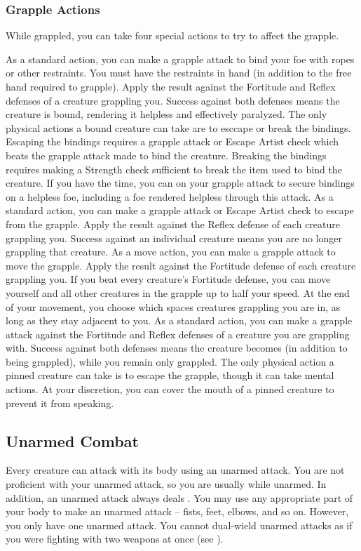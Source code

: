         \subsubsection{Grapple Actions}\label{Grapple Actions}
            While grappled, you can take four special actions to try to affect the grapple.

             As a standard action, you can make a grapple attack to bind your foe with ropes or other restraints. You must have the restraints in hand (in addition to the free hand required to grapple). Apply the result against the Fortitude and Reflex defenses of a creature grappling you. Success against both defenses means the creature is bound, rendering it helpless and effectively paralyzed. The only physical actions a bound creature can take are to esccape or break the bindings. Escaping the bindings requires a grapple attack or Escape Artist check which beats the grapple attack made to bind the creature. Breaking the bindings requires making a Strength check sufficient to break the item used to bind the creature. If you have the time, you can  on your grapple attack to secure bindings on a helpless foe, including a foe rendered helpless through this attack.
             As a standard action, you can make a grapple attack or Escape Artist check to escape from the grapple. Apply the result against the Reflex defense of each creature grappling you. Success against an individual creature means you are no longer grappling that creature.
             As a move action, you can make a grapple attack to move the grapple. Apply the result against the Fortitude defense of each creature grappling you. If you beat every creature's Fortitude defense, you can move yourself and all other creatures in the grapple up to half your speed. At the end of your movement, you choose which spaces creatures grappling you are in, as long as they stay adjacent to you.
             As a standard action, you can make a grapple attack against the Fortitude and Reflex defenses of a creature you are grappling with. Success against both defenses means the creature becomes  (in addition to being grappled), while you remain only grappled. The only physical action a pinned creature can take is to escape the grapple, though it can take mental actions. At your discretion, you can cover the mouth of a pinned creature to prevent it from speaking.

    \subsection{Unarmed Combat}\label{Unarmed Combat}
        Every creature can attack with its body using an unarmed attack.
        You are not proficient with your unarmed attack, so you are usually  while unarmed.
        In addition, an unarmed attack always deals .
        You may use any appropriate part of your body to make an unarmed attack -- fists, feet, elbows, and so on.
        However, you only have one unarmed attack.
        You cannot dual-wield unarmed attacks as if you were fighting with two weapons at once (see ).

